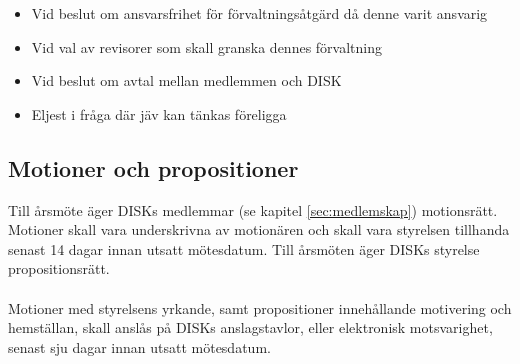                 \begin{itemize}
                \setlength{\itemsep}{0.0cm}
                \setlength{\parskip}{0.0cm}
                        \item Vid beslut om ansvarsfrihet för förvaltningsåtgärd då denne varit ansvarig
                        \item Vid val av revisorer som skall granska dennes förvaltning
                        \item Vid beslut om avtal mellan medlemmen och DISK
                        \item Eljest i fråga där jäv kan tänkas föreligga
                \end{itemize}

        \subsection{Motioner och propositioner}
        \label{subsec:motionerochpropositioner}
                Till årsmöte äger DISKs medlemmar (se kapitel \ref{sec:medlemskap}) motionsrätt. Motioner skall vara underskrivna av motionären och skall vara styrelsen tillhanda senast 14 dagar innan utsatt mötesdatum.
                Till årsmöten äger DISKs styrelse propositionsrätt.\\ \\
Motioner med styrelsens yrkande, samt propositioner innehållande motivering och hemställan, skall anslås på DISKs anslagstavlor, eller elektronisk motsvarighet, senast sju dagar innan utsatt mötesdatum.

